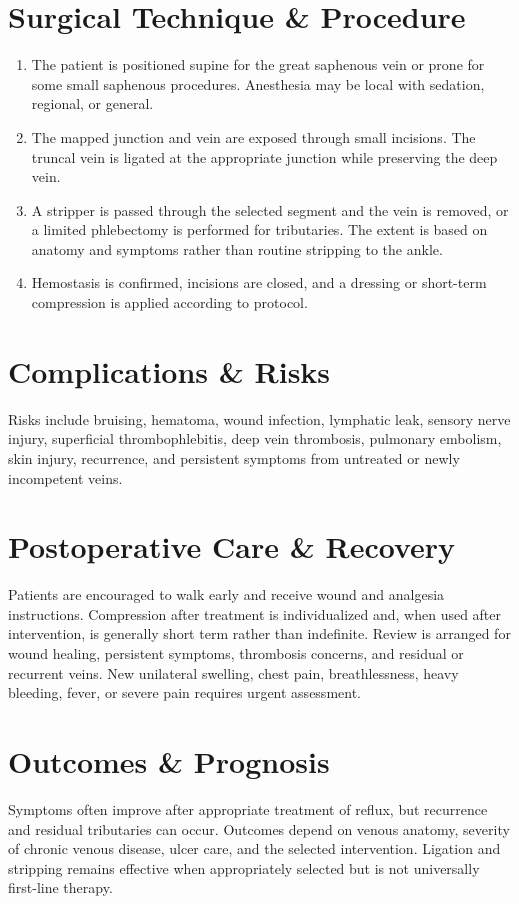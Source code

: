 \section*{Surgical Technique \& Procedure}
\begin{enumerate}
  \item The patient is positioned supine for the great saphenous vein or prone for some small saphenous procedures. Anesthesia may be local with sedation, regional, or general.
  \item The mapped junction and vein are exposed through small incisions. The truncal vein is ligated at the appropriate junction while preserving the deep vein.
  \item A stripper is passed through the selected segment and the vein is removed, or a limited phlebectomy is performed for tributaries. The extent is based on anatomy and symptoms rather than routine stripping to the ankle.
  \item Hemostasis is confirmed, incisions are closed, and a dressing or short-term compression is applied according to protocol.
\end{enumerate}

\section*{Complications \& Risks}
Risks include bruising, hematoma, wound infection, lymphatic leak, sensory nerve injury, superficial thrombophlebitis, deep vein thrombosis, pulmonary embolism, skin injury, recurrence, and persistent symptoms from untreated or newly incompetent veins.

\section*{Postoperative Care \& Recovery}
Patients are encouraged to walk early and receive wound and analgesia instructions. Compression after treatment is individualized and, when used after intervention, is generally short term rather than indefinite. Review is arranged for wound healing, persistent symptoms, thrombosis concerns, and residual or recurrent veins. New unilateral swelling, chest pain, breathlessness, heavy bleeding, fever, or severe pain requires urgent assessment.

\section*{Outcomes \& Prognosis}
Symptoms often improve after appropriate treatment of reflux, but recurrence and residual tributaries can occur. Outcomes depend on venous anatomy, severity of chronic venous disease, ulcer care, and the selected intervention. Ligation and stripping remains effective when appropriately selected but is not universally first-line therapy.

